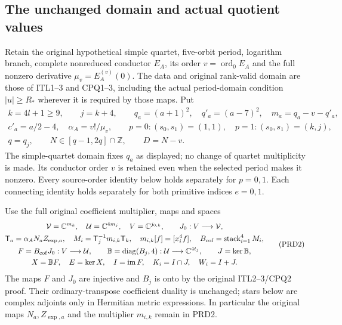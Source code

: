 \documentclass[11pt,a4paper]{article}
\begin{document}
\subsection{The unchanged domain and actual quotient values}
Retain the original hypothetical simple quartet, five-orbit period,
logarithm branch, complete nonreduced conductor $E_A$, its order
$v=\operatorname{ord}_0E_A$ and the full nonzero derivative
$\mu_v=E_A^{(v)}(0)$. The data and original rank-valid domain are
those of ITL1--3 and CPQ1--3, including the actual period-domain
condition $|u|\ge R_*$ wherever it is required by those maps. Put
\[
\begin{gathered}
 k=4l+1\ge9,\qquad j=k+4,\qquad
 q_a=(a+1)^2,\quad q'_a=(a-7)^2,\quad m_a=q_a-v-q'_a,\\
 c'_a=a/2-4,\quad \alpha_A=v!/\mu_v,\qquad
 p=0:(s_0,s_1)=(1,1),\quad p=1:(s_0,s_1)=(k,j),\\
 q=q_j,\qquad N\in[q-1,2q]\cap\mathbb Z,\qquad D=N-v.
\end{gathered}                                                    \tag{PRD1}
\]
The simple-quartet domain fixes $q_a$ as displayed; no change of
quartet multiplicity is made. Its conductor order $v$ is retained
even when the selected period makes it nonzero. Every source-order
identity below holds separately for $p=0,1$. Each connecting identity
holds separately for both primitive indices $e=0,1$.

Use the full original coefficient multiplier, maps and spaces
\[
\begin{gathered}
 \mathcal V=\mathbb C^{m_k},\quad
 \mathcal U=\mathbb C^{4m_j},\quad
 V=\mathbb C^{j_{0,k}},\qquad J_0:V\longrightarrow\mathcal V,\\
 \mathsf T_a=\alpha_A N_aZ_{\exp,a},\quad
 M_i=\mathsf T_j^{-1}m_{i,k}\mathsf T_k,\quad
 m_{i,k}[f]=[x_i^4f],\quad
 B_{\rm cof}=\operatorname{stack}_{i=1}^4M_i,\\
 F=B_{\rm cof}J_0:V\longrightarrow\mathcal U,\qquad
 \mathbb B=\operatorname{diag}(B_j,4):\mathcal U
          \longrightarrow\mathbb C^{4t_j},\qquad
 J=\ker\mathbb B,\\
 X=\mathbb BF,\quad E=\ker X,\quad
 I=\operatorname{im}F,\quad K_i=I\cap J,\quad W_i=I+J.
\end{gathered}                                                    \tag{PRD2}
\]
The maps $F$ and $J_0$ are injective and $B_j$ is onto by the
original ITL2--3/CPQ2 proof. Their ordinary-transpose coefficient
duality is unchanged; stars below are complex adjoints only in
Hermitian metric expressions. In particular the original maps
$N_a,Z_{\exp,a}$ and the multiplier $m_{i,k}$ remain in PRD2.
\end{document}
